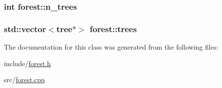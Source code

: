 \hypertarget{classforest_ad1cb197d16e4895d196a4981f55d73ef}{
\subsubsection[{n\+\_\+trees}]{\setlength{\rightskip}{0pt plus 5cm}int forest\+::n\+\_\+trees\hspace{0.3cm}{\ttfamily [protected]}}}\label{classforest_ad1cb197d16e4895d196a4981f55d73ef}
\hypertarget{classforest_a4645ed80361bfa95d2135a816f67344a}{
\subsubsection[{trees}]{\setlength{\rightskip}{0pt plus 5cm}std\+::vector$<${\bf tree}$\ast$$>$ forest\+::trees\hspace{0.3cm}{\ttfamily [protected]}}}\label{classforest_a4645ed80361bfa95d2135a816f67344a}


The documentation for this class was generated from the following files\+:\begin{DoxyCompactItemize}
\item 
include/\hyperlink{forest_8h}{forest.\+h}\item 
src/\hyperlink{forest_8cpp}{forest.\+cpp}\end{DoxyCompactItemize}
